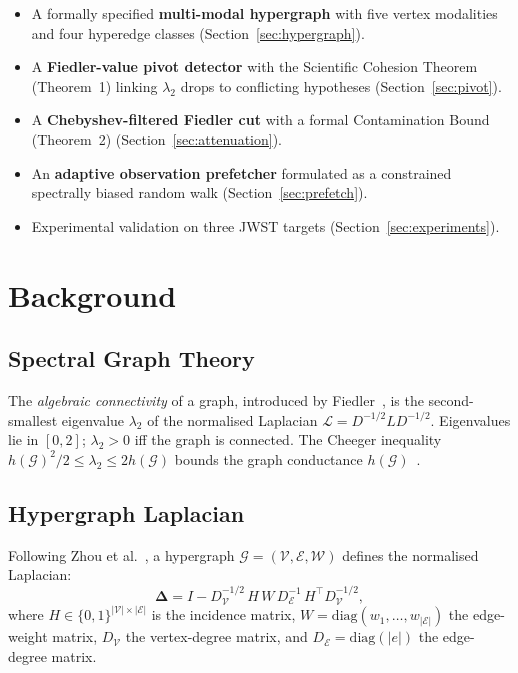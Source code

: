 \documentclass[conference]{IEEEtran}
\newcommand{\lam}{\lambda_2}
\newcommand{\Gcal}{\mathcal{G}}
\newcommand{\Vcal}{\mathcal{V}}
\newcommand{\Ecal}{\mathcal{E}}
\newcommand{\Deltab}{\boldsymbol{\Delta}}
\begin{document}
\begin{itemize}
  \item A formally specified \textbf{multi-modal hypergraph} with five
        vertex modalities and four hyperedge classes (Section~\ref{sec:hypergraph}).
  \item A \textbf{Fiedler-value pivot detector} with the Scientific
        Cohesion Theorem (Theorem~1) linking $\lam$ drops to conflicting
        hypotheses (Section~\ref{sec:pivot}).
  \item A \textbf{Chebyshev-filtered Fiedler cut} with a formal
        Contamination Bound (Theorem~2) (Section~\ref{sec:attenuation}).
  \item An \textbf{adaptive observation prefetcher} formulated as a
        constrained spectrally biased random walk
        (Section~\ref{sec:prefetch}).
  \item Experimental validation on three JWST targets
        (Section~\ref{sec:experiments}).
\end{itemize}

\section{Background}\label{sec:background}

\subsection{Spectral Graph Theory}
The \emph{algebraic connectivity} of a graph, introduced by
Fiedler~\cite{fiedler1973}, is the second-smallest eigenvalue $\lam$ of
the normalised Laplacian $\mathcal{L} = D^{-1/2}LD^{-1/2}$.
Eigenvalues lie in $[0,2]$; $\lam > 0$ iff the graph is connected.
The Cheeger inequality $h(\Gcal)^2/2 \leq \lam \leq 2h(\Gcal)$
bounds the graph conductance $h(\Gcal)$~\cite{chung1997}.

\subsection{Hypergraph Laplacian}
Following Zhou et al.~\cite{zhou2006hypergraph}, a hypergraph
$\Gcal = (\Vcal,\Ecal,\mathcal{W})$ defines the normalised Laplacian:
\begin{equation}
  \Deltab = I - D_\Vcal^{-1/2}\,H\,W\,D_\Ecal^{-1}\,H^\top D_\Vcal^{-1/2},
  \label{eq:laplacian}
\end{equation}
where $H \in \{0,1\}^{|\Vcal|\times|\Ecal|}$ is the incidence matrix,
$W = \mathrm{diag}(w_1,\ldots,w_{|\Ecal|})$ the edge-weight matrix,
$D_\Vcal$ the vertex-degree matrix, and $D_\Ecal = \mathrm{diag}(|e|)$
the edge-degree matrix.
\end{document}
